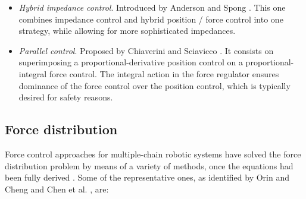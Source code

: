 \begin{itemize}
			\item \emph{Hybrid impedance control}.
						Introduced by Anderson and Spong \cite{Anderson_JRobticsAuto1988}.
						This one combines impedance control and hybrid position / force control into one
						strategy, while allowing for more sophisticated impedances.
						
			\item \emph{Parallel control}.
						Proposed by Chiaverini and Sciavicco \cite{Chiaverini_RoboticsAuto1993}.
						It consists on superimposing a proportional-derivative position control on a
						proportional-integral force control.
						The integral action in the force regulator ensures dominance of the force control
						over the position control, which is typically desired for safety reasons.
						
		\end{itemize}
		
	\subsection{Force distribution}
		\label{sub:distribution}
		
		Force control approaches for multiple-chain robotic systems have solved the	force distribution
		problem by means of a variety of methods, once the equations had been fully	derived
		\cite{Orin_AdvRobotics1989}.
		Some of the representative ones, as identified by Orin and Cheng \cite{Orin_AdvRobotics1989} and
		Chen et al. \cite{Chen_MIRC1999},	are:
		
